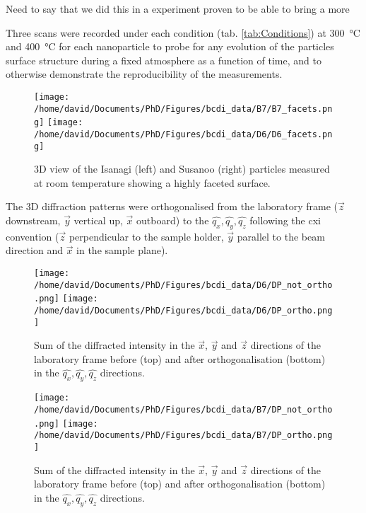 \textcolor{Important}{Need to say that we did this in a experiment}
proven to be able to bring a more

Three scans were recorded under each condition (tab. \ref{tab:Conditions}) at \qty{300}{\degreeCelsius} and \qty{400}{\degreeCelsius} for each nanoparticle to probe for any evolution of the particles surface structure during a fixed atmosphere as a function of time, and to otherwise demonstrate the reproducibility of the measurements.

\begin{figure}[!htb]
    \centering
    \texttt{[image: /home/david/Documents/PhD/Figures/bcdi\_data/B7/B7\_facets.png]}
    \texttt{[image: /home/david/Documents/PhD/Figures/bcdi\_data/D6/D6\_facets.png]}
    \caption{
        3D view of the Isanagi (left) and Susanoo (right) particles measured at room temperature showing a highly faceted surface.
    }
    \label{fig:IsanagiSusanooFacets}
\end{figure}

The 3D diffraction patterns were orthogonalised from the laboratory frame ($\vec{z}$ downstream, $\vec{y}$ vertical up, $\vec{x}$ outboard) to the $\hat{q_x}, \hat{q_y}, \hat{q_z}$ following the cxi convention ($\vec{z}$ perpendicular to the sample holder, $\vec{y}$ parallel to the beam direction and $\vec{x}$ in the sample plane).

\begin{figure}[!htb]
    \centering
    \texttt{[image: /home/david/Documents/PhD/Figures/bcdi\_data/D6/DP\_not\_ortho.png]}
    \texttt{[image: /home/david/Documents/PhD/Figures/bcdi\_data/D6/DP\_ortho.png]}
    \caption{
        Sum of the diffracted intensity in the $\vec{x}$, $\vec{y}$ and $\vec{z}$ directions of the laboratory frame before (top) and after orthogonalisation (bottom) in the $\hat{q_x}, \hat{q_y}, \hat{q_z}$ directions.
    }
    \label{fig:IsanagiOrtho}
\end{figure}

\begin{figure}[!htb]
    \centering
    \texttt{[image: /home/david/Documents/PhD/Figures/bcdi\_data/B7/DP\_not\_ortho.png]}
    \texttt{[image: /home/david/Documents/PhD/Figures/bcdi\_data/B7/DP\_ortho.png]}
    \caption{
        Sum of the diffracted intensity in the $\vec{x}$, $\vec{y}$ and $\vec{z}$ directions of the laboratory frame before (top) and after orthogonalisation (bottom) in the $\hat{q_x}, \hat{q_y}, \hat{q_z}$ directions.
    }
    \label{fig:SusanooOrtho}
\end{figure}

